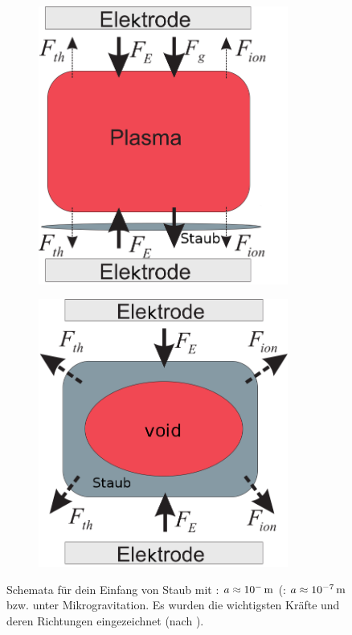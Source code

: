       \begin{figure}[!t]
        \centering
        \begin{subfigure}[b]{0.45\textwidth}
          \includegraphics[width=0.9\textwidth,height=0.9\textwidth]{figs/directionsofforcesandtrappingmelzerlinks.png}
          \caption{}
          \label{img:linksdirection}
        \end{subfigure}
        \begin{subfigure}[b]{0.45\textwidth}
          \includegraphics[width=0.9\textwidth,height=0.9\textwidth]{figs/directionsofforcesandtrappingmelzerrechts.png}
          \caption{}
          \label{img:rechtsdirection}
        \end{subfigure}
        \caption{Schemata für dein Einfang von Staub mit : $a\approx\unit[\tenpo{-}]{m}$ (: $a\approx\unit[\tenpo{-7}]{m}$ bzw. unter Mikrogravitation. Es wurden die wichtigsten Kräfte und deren Richtungen eingezeichnet (nach \cite{Melzer12}).}
        \label{img:kräfterichtungen}
      \end{figure}

